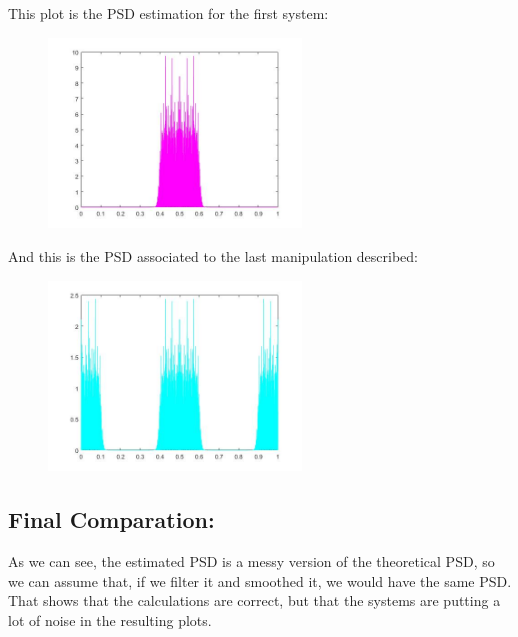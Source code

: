 \documentclass[a4paper,11pt]{article}
\begin{document}
This plot is the PSD estimation for the first system:

\begin{figure}[!hp]
    \begin{center}
    \includegraphics[width=0.6\textwidth]{images/lab4_figure8.jpg}
    \end{center}
\end{figure}

\newpage

And this is the PSD associated to the last manipulation described:

\begin{figure}[!hp]
    \begin{center}
    \includegraphics[width=0.6\textwidth]{images/lab4_figure9.jpg}
    \end{center}
\end{figure}

\subsection{Final Comparation:}

As we can see, the estimated PSD is a messy version of the theoretical PSD, so we can assume that, if we filter it and smoothed it, we would have the same PSD. That shows that the calculations are correct, but that the systems are putting a lot of noise in the resulting plots.

\vspace{4cm}
\end{document}
